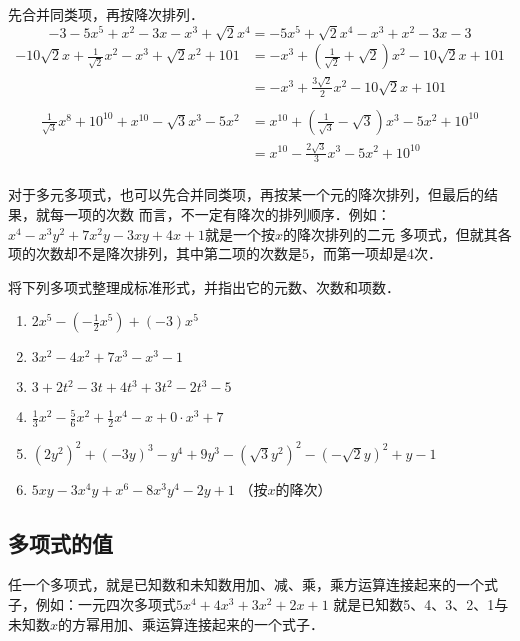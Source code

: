 \begin{solution}
    先合并同类项，再按降次排列．
\[
   -3-5x^5+x^2-3x-x^3+\sqrt{2}x^4=-5x^5+\sqrt{2}x^4-x^3+x^2-3x-3
\]
\[\begin{split}
  -10\sqrt{2}x+\frac{1}{\sqrt{2}}x^2-x^3+\sqrt{2}x^2+101
    &=-x^3+\left(\frac{1}{\sqrt{2}}+\sqrt{2}\right)x^2-10\sqrt{2}x+101\\
    &=-x^3+\frac{3\sqrt{2}}{2}x^2-10\sqrt{2}x+101\\
\end{split}\]
\[\begin{split}
  \frac{1}{\sqrt{3}}x^8+10^{10}+x^{10}-\sqrt{3}x^3-5x^2
    &=x^{10}+\left(\frac{1}{\sqrt{3}}-\sqrt{3}\right)x^3-5x^2+10^{10}\\
    &=x^{10}-\frac{2\sqrt{3}}{3}x^3-5x^2+10^{10}\\
\end{split}\]

\end{solution}

对于多元多项式，也可以先合并同类项，再按某一个元的降次排列，但最后的结果，就每一项的次数
而言，不一定有降次的排列顺序．例如：$x^4-x^3y^2+7x^2y-3xy+4x+1$就是一个按$x$的降次排列的二元
多项式，但就其各项的次数却不是降次排列，其中第二项的次数是5，而第一项却是4次．

\begin{ex}
    将下列多项式整理成标准形式，并指出它的元数、次数和项数．
    \begin{enumerate}
        \item $2x^5-\left(-\frac{1}{2}x^5\right)+(-3)x^5$
        \item $3x^2-4x^2+7x^3-x^3-1$
        \item $3+2t^2-3t+4t^3+3t^2-2t^3-5$
        \item $\frac{1}{3}x^2-\frac{5}{6}x^2+\frac{1}{2}x^4-x+0\cdot x^3+7$
        \item $(2y^2)^2+(-3y)^3-y^4+9y^3-\left(\sqrt{3}y^2\right)^2-\left(-\sqrt{2}y\right)^2+y-1$
        \item $5xy-3x^4y+x^6-8x^3y^4-2y+1$ （按$x$的降次）
    \end{enumerate}
\end{ex}

\subsection{多项式的值}
任一个多项式，就是已知数和未知数用加、减、乘，乘方运算连接起来的一个式子，例如：一元四次多项式$5x^4+4x^3+3x^2+2x+1$
就是已知数5、4、3、2、1与未知数$x$的方幂用加、乘运算连接起来的一个式子．

